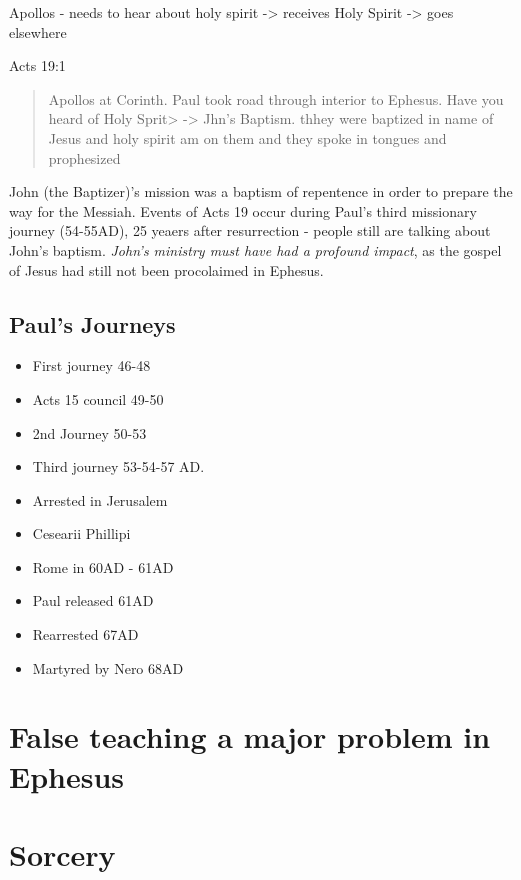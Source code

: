 \documentclass[
]{book}
\begin{document}
Apollos - needs to hear about holy spirit -\textgreater{} receives Holy Spirit -\textgreater{} goes elsewhere

Acts 19:1

\begin{quote}
Apollos at Corinth. Paul took road through interior to Ephesus. Have you heard of Holy Sprit\textgreater{} -\textgreater{} Jhn's Baptism. thhey were baptized in name of Jesus and holy spirit am on them and they spoke in tongues and prophesized
\end{quote}

John (the Baptizer)'s mission was a baptism of repentence in order to prepare the way for the Messiah. Events of Acts 19 occur during Paul's third missionary journey (54-55AD), 25 yeaers after resurrection - people still are talking about John's baptism. \emph{John's ministry must have had a profound impact}, as the gospel of Jesus had still not been procolaimed in Ephesus.

\hypertarget{pauls-journeys}{%
\subsection{Paul's Journeys}\label{pauls-journeys}}

\begin{itemize}
\item
  First journey 46-48
\item
  Acts 15 council 49-50
\item
  2nd Journey 50-53
\item
  Third journey 53-54-57 AD.
\item
  Arrested in Jerusalem
\item
  Cesearii Phillipi
\item
  Rome in 60AD - 61AD
\item
  Paul released 61AD
\item
  Rearrested 67AD
\item
  Martyred by Nero 68AD
\end{itemize}

\hypertarget{false-teaching-a-major-problem-in-ephesus}{%
\section{False teaching a major problem in Ephesus}\label{false-teaching-a-major-problem-in-ephesus}}

\hypertarget{sorcery}{%
\section{Sorcery}\label{sorcery}}
\end{document}
